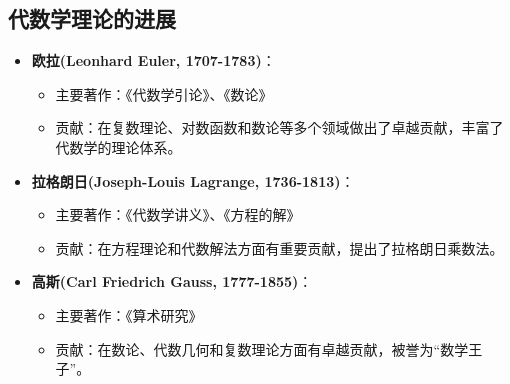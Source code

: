 \documentclass{Math_Note}
\begin{document}
\subsection{代数学理论的进展}
\begin{itemize}
    \item \textbf{欧拉(Leonhard Euler, 1707-1783)}：
    \begin{itemize}
        \item 主要著作：《代数学引论》、《数论》
        \item 贡献：在复数理论、对数函数和数论等多个领域做出了卓越贡献，丰富了代数学的理论体系。
    \end{itemize}
    
    \item \textbf{拉格朗日(Joseph-Louis Lagrange, 1736-1813)}：
    \begin{itemize}
        \item 主要著作：《代数学讲义》、《方程的解》
        \item 贡献：在方程理论和代数解法方面有重要贡献，提出了拉格朗日乘数法。
    \end{itemize}
    
    \item \textbf{高斯(Carl Friedrich Gauss, 1777-1855)}：
    \begin{itemize}
        \item 主要著作：《算术研究》
        \item 贡献：在数论、代数几何和复数理论方面有卓越贡献，被誉为“数学王子”。
    \end{itemize}
\end{itemize}
\end{document}
